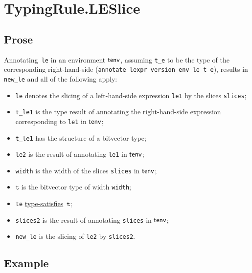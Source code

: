 \documentclass{book}
\newcommand\typesatisfies[0]{\hyperlink{def-typesatisfies}{type-satisfies}}
\newcommand\vt[0]{\texttt{t}}
\begin{document}

\section{TypingRule.LESlice \label{sec:TypingRule.LESlice}}

  \subsection{Prose}
   Annotating~\texttt{le} in an environment $\textsf{tenv}$, assuming
\texttt{t\_e} to be the type of the corresponding right-hand-side
(\texttt{annotate\_lexpr version env le t\_e}), results in \texttt{new\_le} and
all of the following apply:
   \begin{itemize}
   \item \texttt{le} denotes the slicing of a left-hand-side expression \texttt{le1} by the slices \texttt{slices};
   \item \texttt{t\_le1} is the type result of annotating the right-hand-side expression corresponding to \texttt{le1} in $\textsf{tenv}$;
   \item \texttt{t\_le1} has the structure of a bitvector type;
   \item \texttt{le2} is the result of annotating \texttt{le1} in $\textsf{tenv}$;
   \item \texttt{width} is the width of the slices \texttt{slices} in $\textsf{tenv}$;
   \item $\vt$ is the bitvector type of width \texttt{width};
   \item \texttt{te} \typesatisfies\  $\vt$;
   \item \texttt{slices2} is the result of annotating \texttt{slices} in $\textsf{tenv}$;
   \item \texttt{new\_le} is the slicing of \texttt{le2} by \texttt{slices2}.
   \end{itemize}

  \subsection{Example}


\end{document}
